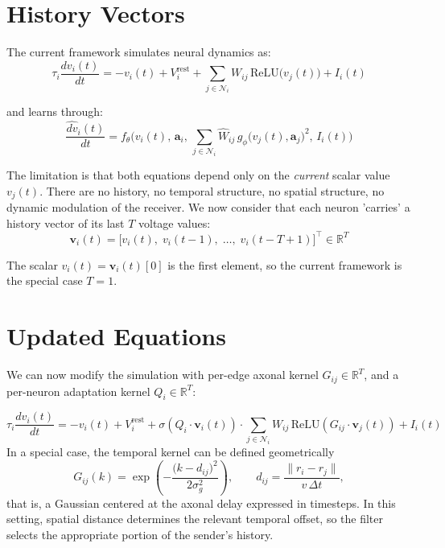 \documentclass[11pt]{article}
\begin{document}
\section{History Vectors}

The current framework simulates neural dynamics as:
\begin{equation}
\tau_i\frac{dv_i(t)}{dt} = -v_i(t) + V_i^{\text{rest}}
+ \sum_{j\in\mathcal{N}_i} W_{ij}\,
  \mathrm{ReLU}\!\big(v_j(t)\big)
+ I_i(t)
\label{eq:sim_current}
\end{equation}

and learns through:
\begin{equation}
\frac{\widehat{dv}_i(t)}{dt}
= f_\theta\!\Big(
v_i(t),\,\mathbf{a}_i,\,
\sum_{j\in\mathcal{N}_i} \hat{W}_{ij}\,
g_\phi\!\big(v_j(t),\mathbf{a}_j\big)^2,\,
I_i(t)\Big)
\label{eq:gnn_current}
\end{equation}

The limitation is that both equations depend only on the
\emph{current} scalar value $v_j(t)$. There are no history, no temporal structure, no spatial structure, no dynamic modulation of the receiver. We now consider that each neuron 'carries' a history vector of its last $T$ voltage values:
\begin{equation}
\mathbf{v}_i(t) = \bigl[v_i(t),\; v_i(t-1),\; \ldots,\; v_i(t-T+1)\bigr]^\top
\in \mathbb{R}^T
\end{equation}

The scalar $v_i(t) = \mathbf{v}_i(t)[0]$ is the first element, so
the current framework is the special case $T=1$. 

\section{Updated Equations}

We can now modify the simulation with per-edge axonal kernel
$G_{ij} \in \mathbb{R}^T$, and a per-neuron adaptation kernel
$Q_i \in \mathbb{R}^T$:

\begin{equation}
\boxed{
\tau_i\frac{dv_i(t)}{dt} = -v_i(t) + V_i^{\text{rest}}
+ \sigma\!\left(Q_i \cdot \mathbf{v}_i(t)\right)
\cdot \sum_{j\in\mathcal{N}_i} W_{ij}\,
  \mathrm{ReLU}\!\left(G_{ij} \cdot \mathbf{v}_j(t)\right)
+ I_i(t)
}
\label{eq:sim_new}
\end{equation}
In a special case, the temporal kernel can be defined geometrically
\begin{equation}
G_{ij}(k) = \exp\!\left(-\frac{\bigl(k - d_{ij}\bigr)^2}{2\sigma_g^2}\right),
\qquad d_{ij} = \frac{\|r_i - r_j\|}{v\,\Delta t},
\end{equation}
that is, a Gaussian centered at the axonal delay expressed in timesteps. In this setting, spatial distance determines the relevant temporal offset, so the filter selects the appropriate portion of the sender's history. 
\end{document}
